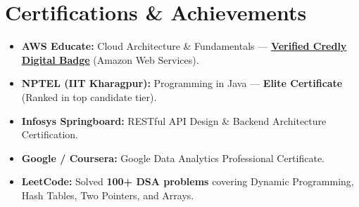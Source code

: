 \documentclass[a4paper,10pt]{article}
\begin{document}
\vspace{0.5pt}

\section*{Certifications \& Achievements}
\begin{itemize}
    \item \textbf{AWS Educate:} Cloud Architecture \& Fundamentals --- \href{https://www.credly.com/badges/dbd1be39-f7f6-4a10-bd37-67cc6646f69c/public_url}{\textbf{Verified Credly Digital Badge}} (Amazon Web Services).
    \item \textbf{NPTEL (IIT Kharagpur):} Programming in Java --- \textbf{Elite Certificate} (Ranked in top candidate tier).
    \item \textbf{Infosys Springboard:} RESTful API Design \& Backend Architecture Certification.
    \item \textbf{Google / Coursera:} Google Data Analytics Professional Certificate.
    \item \textbf{LeetCode:} Solved \textbf{100+ DSA problems} covering Dynamic Programming, Hash Tables, Two Pointers, and Arrays.
\end{itemize}
\end{document}
